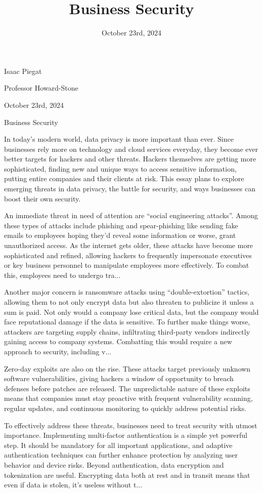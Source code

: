 \documentclass{article}
\title{\centering Business Security}
\author{}
\date{October 23rd, 2024}
\begin{document}
Isaac Piegat

Professor Howard-Stone

October 23rd, 2024

Business Security

In today’s modern world, data privacy is more important than ever. Since businesses rely more on technology and cloud services everyday, they become ever better targets for hackers and other threats. Hackers themselves are getting more sophisticated, finding new and unique ways to access sensitive information, putting entire companies and their clients at risk. This essay plans to explore emerging threats in data privacy, the battle for security, and ways businesses can boost their own security.

An immediate threat in need of attention are “social engineering attacks”. Among these types of attacks include phishing and spear-phishing like sending fake emails to employees hoping they’d reveal some information or worse, grant unauthorized access. As the internet gets older, these attacks have become more sophisticated and refined, allowing hackers to frequently impersonate executives or key business personnel to manipulate employees more effectively. To combat this, employees need to undergo tra...

Another major concern is ransomware attacks using “double-extortion” tactics, allowing them to not only encrypt data but also threaten to publicize it unless a sum is paid. Not only would a company lose critical data, but the company would face reputational damage if the data is sensitive. To further make things worse, attackers are targeting supply chains, infiltrating third-party vendors indirectly gaining access to company systems. Combatting this would require a new approach to security, including v...

Zero-day exploits are also on the rise. These attacks target previously unknown software vulnerabilities, giving hackers a window of opportunity to breach defenses before patches are released. The unpredictable nature of these exploits means that companies must stay proactive with frequent vulnerability scanning, regular updates, and continuous monitoring to quickly address potential risks.

To effectively address these threats, businesses need to treat security with utmost importance. Implementing multi-factor authentication is a simple yet powerful step. It should be mandatory for all important applications, and adaptive authentication techniques can further enhance protection by analyzing user behavior and device risks. Beyond authentication, data encryption and tokenization are useful. Encrypting data both at rest and in transit means that even if data is stolen, it’s useless without t...
\end{document}
